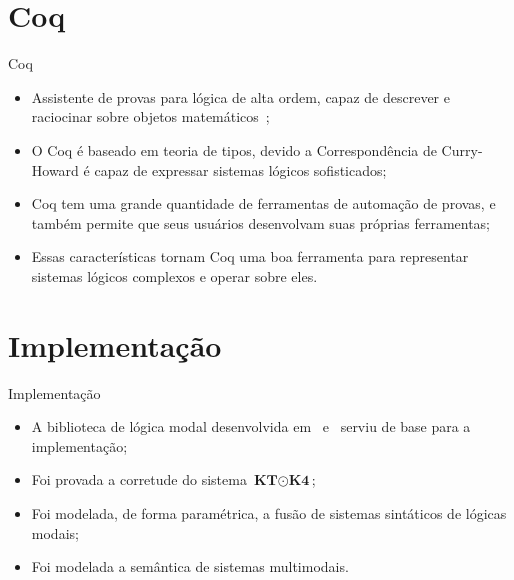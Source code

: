 \documentclass[xcolor=table]{beamer}
\newcommand{\SisT}{\(\textbf{KT} \mathbin{\odot} \textbf{K4}\)\xspace}
\begin{document}
    \section[]{Coq}
    \begin{frame}{Coq}
        \begin{itemize}
            \item Assistente de provas para lógica de alta ordem, capaz de descrever e raciocinar sobre objetos matemáticos~\cite{geuvers2009proof};
            \item O Coq é baseado em teoria de tipos, devido a Correspondência de Curry-Howard é capaz de expressar sistemas lógicos sofisticados;
            \item Coq tem uma grande quantidade de ferramentas de automação de provas, e também permite que seus usuários desenvolvam suas próprias ferramentas;
            \item Essas características tornam Coq uma boa ferramenta para representar sistemas lógicos complexos e operar sobre eles.
        \end{itemize}
    \end{frame}

    \section[]{Implementação}
    \begin{frame}{Implementação}
        \begin{itemize}
            \item A biblioteca de lógica modal desenvolvida em~\cite{silveira2020implementacao} e~\cite{silveira2022sound} serviu de base para a implementação;
            \item Foi provada a corretude do sistema \SisT;
            \item Foi modelada, de forma paramétrica, a fusão de sistemas sintáticos de lógicas modais;
            \item Foi modelada a semântica de sistemas multimodais.
        \end{itemize}
    \end{frame}
\end{document}
